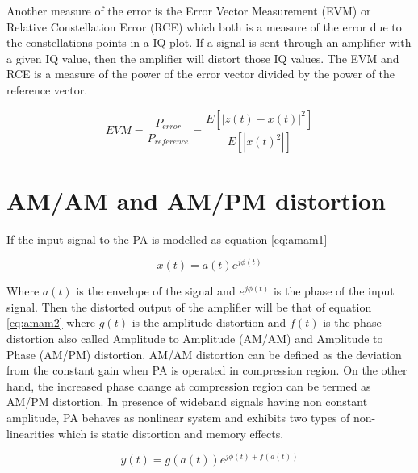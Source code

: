 Another measure of the error is the Error Vector Measurement (EVM) or  Relative Constellation Error (RCE) which both is a measure of the error due to the constellations points in a IQ plot. If a signal is sent through an amplifier with a given IQ value, then the amplifier will distort those IQ values. The EVM and RCE is a measure of the power of the error vector divided by the power of the reference vector. \citep{ali2016}

\begin{equation} \label{eq:evm}
	EVM = \frac{P_{error}}{P_{reference}} = \frac{E[|z(t)-x(t)|^2]}{E[|x(t)^2|]}
\end{equation}  
 


\section{AM/AM and AM/PM distortion}
If the input signal to the PA is modelled as equation \ref{eq:amam1}

\begin{equation}\label{eq:amam1}
x(t) = a(t)e^{j\phi(t)}
\end{equation}

Where $a(t)$ is the envelope of the signal and $e^{j\phi(t)}$ is the phase of the input signal. Then the distorted output of the amplifier will be that of equation \ref{eq:amam2} where $g(t)$ is the amplitude distortion and $f(t)$ is the phase distortion also called Amplitude to Amplitude (AM/AM) and Amplitude to Phase (AM/PM) distortion. AM/AM distortion can be defined as the deviation from the constant gain when PA is
operated in compression region. On the other hand, the increased phase change at compression
region can be termed as AM/PM distortion. In presence of wideband signals having non constant amplitude, PA behaves as nonlinear system and exhibits two types of non-linearities \citep{guo2015} which is static distortion and memory effects.  

\begin{equation}\label{eq:amam2}
y(t) = g(a(t))e^{j\phi(t)+f(a(t))}
\end{equation}


